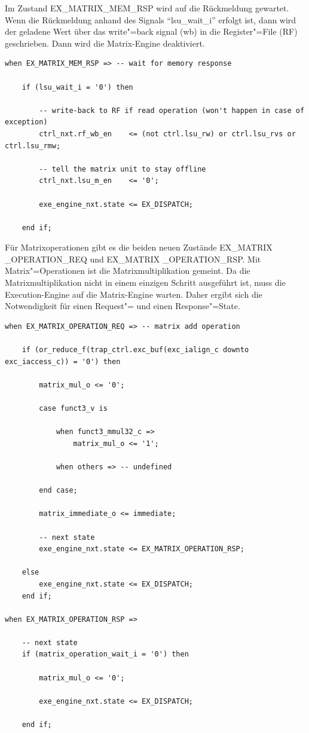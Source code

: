 Im Zustand EX\_MATRIX\_MEM\_RSP wird auf die Rückmeldung gewartet. Wenn die Rückmeldung anhand des Signals ``lsu\_wait\_i'' erfolgt ist, dann wird der geladene Wert über das write"=back signal (wb) in die Register"=File (RF) geschrieben. Dann wird die Matrix-Engine deaktiviert.

\begin{lstlisting}[style=VHDLStyle,caption={Ende der Speichertransaktionen},captionpos=b]
when EX_MATRIX_MEM_RSP => -- wait for memory response

    if (lsu_wait_i = '0') then

        -- write-back to RF if read operation (won't happen in case of exception)
        ctrl_nxt.rf_wb_en    <= (not ctrl.lsu_rw) or ctrl.lsu_rvs or ctrl.lsu_rmw;

        -- tell the matrix unit to stay offline
        ctrl_nxt.lsu_m_en    <= '0';

        exe_engine_nxt.state <= EX_DISPATCH;

    end if;
\end{lstlisting}

Für Matrixoperationen gibt es die beiden neuen Zustände EX\_MATRIX \_OPERATION\_REQ und EX\_MATRIX \_OPERATION\_RSP. Mit Matrix"=Operationen ist die Matrixmultiplikation gemeint. Da die Matrixmultiplikation nicht in einem einzigen Schritt ausgeführt ist, muss die Execution-Engine auf die Matrix-Engine warten. Daher ergibt sich die Notwendigkeit für einen Request"= und einen Response"=State.

\begin{lstlisting}[style=VHDLStyle,caption={Warten auf das Ende der Multiplikation},captionpos=b]
when EX_MATRIX_OPERATION_REQ => -- matrix add operation

    if (or_reduce_f(trap_ctrl.exc_buf(exc_ialign_c downto exc_iaccess_c)) = '0') then

        matrix_mul_o <= '0';

        case funct3_v is

            when funct3_mmul32_c =>
                matrix_mul_o <= '1';

            when others => -- undefined

        end case;

        matrix_immediate_o <= immediate;

        -- next state
        exe_engine_nxt.state <= EX_MATRIX_OPERATION_RSP;

    else
        exe_engine_nxt.state <= EX_DISPATCH;
    end if;

when EX_MATRIX_OPERATION_RSP =>

    -- next state
    if (matrix_operation_wait_i = '0') then

        matrix_mul_o <= '0';

        exe_engine_nxt.state <= EX_DISPATCH;

    end if;
\end{lstlisting}

